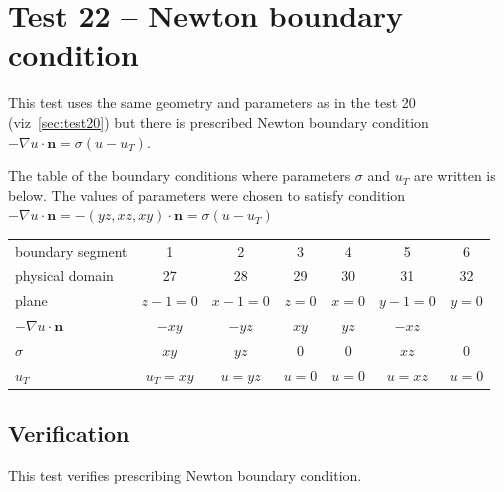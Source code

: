 \section{Test 22 -- Newton boundary condition}
\label{sec:test21}
This test uses the same geometry and parameters as in the test 20 (viz~\ref{sec:test20}) but there is prescribed Newton boundary condition $-\nabla{}u\cdot{}\mathbf{n} = \sigma(u-u_T)$.

The table of the boundary conditions where parameters $\sigma$ and $u_T$ are written is below. The values of parameters were chosen to satisfy condition $-\nabla{}u\cdot{}\mathbf{n} = -(yz,xz,xy)\cdot\mathbf{n} = \sigma(u-u_T)$

\begin{center}
  \begin{tabular}{|l|c|c|c|c|c|c|}
      \hline
      boundary segment & 1 & 2 & 3 & 4 & 5 & 6 \\ 
      physical domain & 27 & 28 & 29 & 30 & 31 & 32 \\ 
      plane & $z-1=0$  & $x-1=0$ & $z=0$ & $x=0$ & $y-1=0$& $y=0$\\
      $-\nabla{}u\cdot{}\mathbf{n}$ & $-xy$ & $-yz$ & $xy$ & $yz$ & $-xz$ &\\
      $\sigma$ & $xy$ & $yz$ & $0$ & $0$ & $xz$ & $0$\\
      $u_T$ & $u_T=xy$ & $u=yz$ & $u=0$ & $u=0$ & $u=xz$ & $u=0$\\
      \hline
  \end{tabular}
\end{center}

\subsection*{Verification}
This test verifies prescribing Newton boundary condition.
